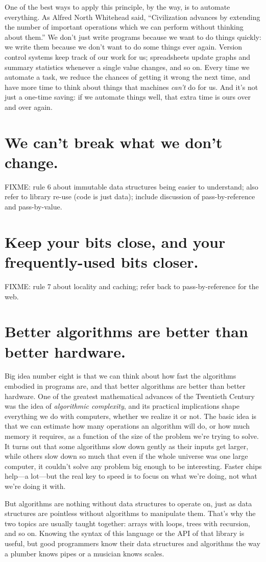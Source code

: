 \documentclass[10pt,letterpaper]{article}
\newcommand{\rulemajor}[1]{\section{#1}}
\begin{document}
One of the best ways to apply this principle, by the way, is to automate
everything.  As Alfred North Whitehead said, ``Civilization advances by
extending the number of important operations which we can perform without
thinking about them.''  We don't just write programs because we want to do
things quickly: we write them because we don't want to do some things ever
again.  Version control systems keep track of our work for us; spreadsheets
update graphs and summary statistics whenever a single value changes, and so on.
Every time we automate a task, we reduce the chances of getting it wrong the
next time, and have more time to think about things that machines \emph{can't}
do for us.  And it's not just a one-time saving: if we automate things well,
that extra time is ours over and over again.

\rulemajor{We can't break what we don't change.}

FIXME: rule 6 about immutable data structures being easier to understand; also
refer to library re-use (code is just data); include discussion of
pass-by-reference and pass-by-value.

\rulemajor{Keep your bits close, and your frequently-used bits closer.}

FIXME: rule 7 about locality and caching; refer back to pass-by-reference for
the web.

\rulemajor{Better algorithms are better than better hardware.}

Big idea number eight is that we can think about how fast the algorithms
embodied in programs are, and that better algorithms are better than better
hardware.  One of the greatest mathematical advances of the Twentieth Century
was the idea of \emph{algorithmic complexity}, and its practical implications
shape everything we do with computers, whether we realize it or not.  The basic
idea is that we can estimate how many operations an algorithm will do, or how
much memory it requires, as a function of the size of the problem we're trying
to solve.  It turns out that some algorithms slow down gently as their inputs
get larger, while others slow down so much that even if the whole universe was
one large computer, it couldn't solve any problem big enough to be interesting.
Faster chips help---a lot---but the real key to speed is to focus on what we're
doing, not what we're doing it with.

But algorithms are nothing without data structures to operate on, just as data
structures are pointless without algorithms to manipulate them.  That's why the
two topics are usually taught together: arrays with loops, trees with recursion,
and so on.  Knowing the syntax of this language or the API of that library is
useful, but good programmers know their data structures and algorithms the way a
plumber knows pipes or a musician knows scales.
\end{document}
